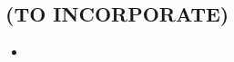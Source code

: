 %
%
%
%
%

\begin{unsortedStuff}	
\section*{(TO INCORPORATE)}
	\begin{itemize}
		\item 
	\end{itemize}
\end{unsortedStuff}
		
\begin{optBlankSpace}
	\newpage
	\mbox{}
\end{optBlankSpace}

